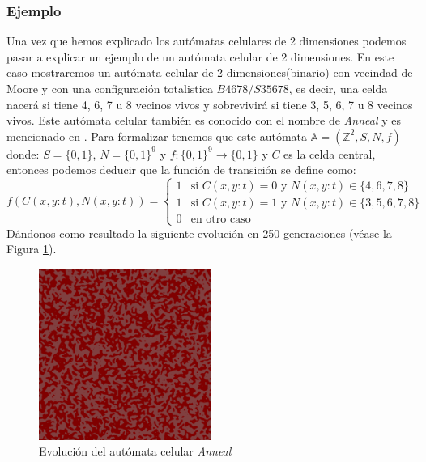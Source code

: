 \clearpage
\subsubsection{Ejemplo}
    Una vez que hemos explicado los aut\'omatas celulares de 2 dimensiones podemos pasar a explicar un ejemplo de un aut\'omata celular de 2 dimensiones.
    \vskip 0.5cm
    En este caso mostraremos un aut\'omata celular de 2 dimensiones(binario) con vecindad de Moore y con una configuraci\'on totalistica 
        $B4678/S35678$, es decir, una celda nacer\'a si tiene 4, 6, 7 u 8 vecinos vivos y sobrevivir\'a si tiene 3, 5, 6, 7 u 8 vecinos vivos.
        Este aut\'omata celular tambi\'en es conocido con el nombre de \textit{Anneal} y es mencionado en \cite{Toffoli1987}.
    \vskip 0.5cm
    Para formalizar tenemos que este aut\'omata $\mathbb{A} = (\mathbb{Z}^2, S, N, f)$ donde: 
        $S = \{0,1\}$, $N = \{0,1\}^9$ y $f: \{0,1\}^9 \rightarrow \{0,1\}$ y $C$ es la celda central, 
        entonces podemos deducir que la funci\'on de transici\'on se define como:
        \begin{equation*}
            f(C(x,y:t),N(x,y:t)) = \begin{cases}
                1 & \text{si } C(x,y:t) = 0 \text{ y } N(x,y:t) \in \{4,6,7,8\} \\
                1 & \text{si } C(x,y:t) = 1 \text{ y } N(x,y:t) \in \{3,5,6,7,8\} \\
                0 & \text{en otro caso}
            \end{cases}
        \end{equation*}
    \vskip 0.5cm
    D\'andonos como resultado la siguiente evoluci\'on en 250 generaciones (v\'ease la Figura \ref{fig:anneal}).
    \begin{figure}[h]
        \centering
        \includegraphics[width=0.5\textwidth]{./images/marco_teorico/automatas_celulares/Anneal.png}
        \caption{Evoluci\'on del aut\'omata celular \textit{Anneal}}
        \label{fig:anneal}
    \end{figure}
    \clearpage